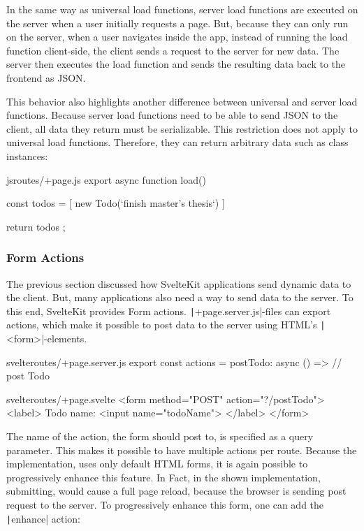 In the same way as universal load functions, server load functions are executed on the server when a user initially requests a page. But, because they can only run on the server, when a user navigates inside the app, instead of running the load function client-side, the client sends a request to the server for new data. The server then executes the load function and sends the resulting data back to the frontend as JSON. 

This behavior also highlights another difference between universal and server load functions. Because server load functions need to be able to send JSON to the client, all data they return must be serializable. This restriction does not apply to universal load functions. Therefore, they can return arbitrary data such as class instances:

\begin{myminted}{js}{routes/+page.js}
export async function load() {
    const todos =  [ new Todo(`finish master's thesis`) ]

    return { todos };
}
\end{myminted}

\subsubsection{Form Actions}
\label{sec:sveltekit-server-actions}

The previous section discussed how SvelteKit applications send dynamic data to the client. But, many applications also need a way to send data to the server. To this end, SvelteKit provides Form actions. \texttt|+page.server.js|-files can export actions, which make it possible to post data to the server using HTML's \texttt|<form>|-elements.

\begin{myminted}{svelte}{routes/+page.server.js}
export const actions = {
    postTodo: async () => {
        // post Todo
    }
}
\end{myminted}    
\begin{myminted}{svelte}{routes/+page.svelte}
<form method="POST" action="?/postTodo">
    <label>
        Todo name:
        <input name="todoName">
    </label>
</form>
\end{myminted}

The name of the action, the form should post to, is specified as a query parameter. This makes it possible to have multiple actions per route. Because the implementation, uses only default HTML forms, it is again possible to progressively enhance this feature. In Fact, in the shown implementation, submitting, would cause a full page reload, because the browser is sending post request to the server. To progressively enhance this form, one can add the \texttt|enhance| action:

